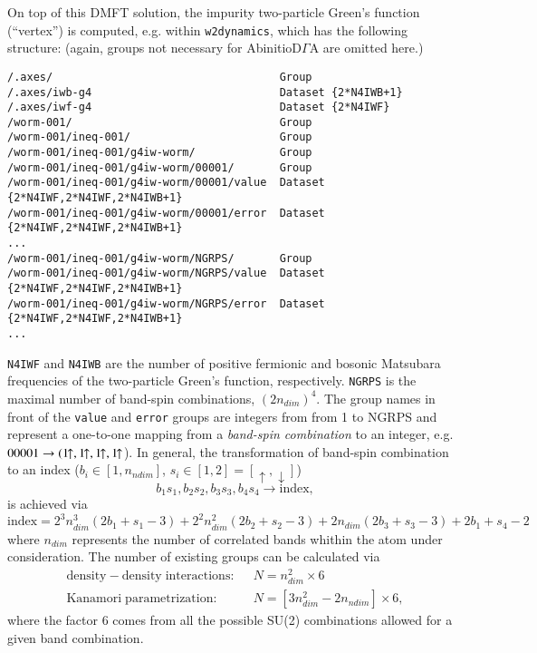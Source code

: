 \documentclass[a4paper,11pt]{article}
\numberwithin{equation}{section} %
\begin{document}
On top of this DMFT solution, the impurity two-particle Green's function (``vertex'') is computed, e.g. within \verb|w2dynamics|,
which has the following structure: (again, groups not necessary for AbinitioD$\Gamma$A
are omitted here.)
\begin{lstlisting}[caption=HDF5-structure of the worm-sampled vertex, frame=single, basicstyle=\small, label={lst:dmft2}]
/.axes/                                   Group
/.axes/iwb-g4                             Dataset {2*N4IWB+1}
/.axes/iwf-g4                             Dataset {2*N4IWF}
/worm-001/                                Group
/worm-001/ineq-001/                       Group
/worm-001/ineq-001/g4iw-worm/             Group
/worm-001/ineq-001/g4iw-worm/00001/       Group
/worm-001/ineq-001/g4iw-worm/00001/value  Dataset {2*N4IWF,2*N4IWF,2*N4IWB+1}
/worm-001/ineq-001/g4iw-worm/00001/error  Dataset {2*N4IWF,2*N4IWF,2*N4IWB+1}
...
/worm-001/ineq-001/g4iw-worm/NGRPS/       Group
/worm-001/ineq-001/g4iw-worm/NGRPS/value  Dataset {2*N4IWF,2*N4IWF,2*N4IWB+1}
/worm-001/ineq-001/g4iw-worm/NGRPS/error  Dataset {2*N4IWF,2*N4IWF,2*N4IWB+1}
...
\end{lstlisting}
\verb|N4IWF| and \verb|N4IWB| are the number of positive fermionic and bosonic Matsubara frequencies of the
two-particle Green's function, respectively. \verb|NGRPS| is the maximal number of band-spin combinations, $(2n_{dim})^4$.
The group names in front of the \verb|value| and \verb|error| groups are integers
from from 1 to NGRPS and represent a one-to-one mapping from a \emph{band-spin combination} 
to an integer, e.g.~$00001 \rightarrow (1\hspace{-4pt}\uparrow, 1\hspace{-4pt}\uparrow, 1\hspace{-4pt}\uparrow, 1\hspace{-4pt}\uparrow$). 
In general, the transformation of band-spin combination to an index ($b_i \in [1,n_{ndim}]$, $s_i \in [1,2] = [\uparrow, \downarrow]$)
\begin{equation*}
b_1 s_1,b_2 s_2, b_3 s_3, b_4s_4 \rightarrow \mathrm{index},
\end{equation*}
is achieved via
\begin{equation*}
\mathrm{index} = 2^3 n_{dim}^3(2 b_1+s_1-3) + 2^2 n_{dim}^2(2 b_2+s_2-3) + 2 n_{dim}(2 b_3+s_3-3) + 2 b_1 + s_4 - 2
\end{equation*}
where $n_{dim}$ represents the number of correlated bands whithin the atom under consideration.
The number of existing groups can be calculated via
\begin{equation*}
\begin{aligned}
\mathrm{density-density\;interactions: }&\;\; N = n_{dim}^2 \times 6 \\
\mathrm{Kanamori\;parametrization: }&\;\; N = \left[3n_{dim}^2 - 2n_{ndim}\right] \times 6,
\end{aligned}
\end{equation*}
where the factor $6$ comes from all the possible SU(2) combinations allowed for a given band combination.
\end{document}
